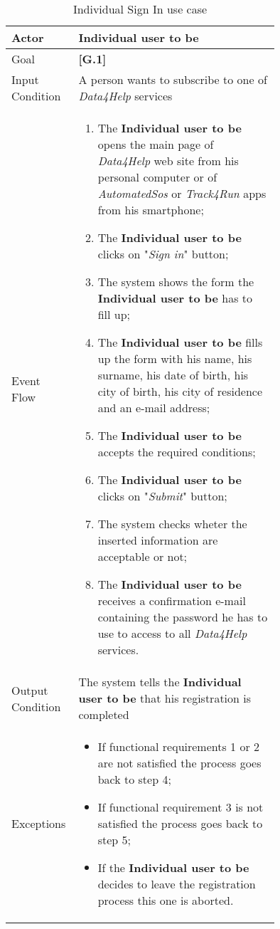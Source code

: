 \begin{center}
\begin{table}
\begin{tabular}{ | l | p{0.75\linewidth} | }
  \hline
    Actor & \textbf{Individual user to be} \\ \hline
    Goal & \textbf{[G.1]} \\ \hline
    Input Condition & A person wants to subscribe to one of \textit{Data4Help} services \\ \hline
    Event Flow & \begin{minipage}[t]{0.7\textwidth}
      \begin{enumerate}
        \item The \textbf{Individual user to be} opens the main page of \textit{Data4Help} web site from his personal computer or of \textit{AutomatedSos} or \textit{Track4Run} apps from his smartphone;
        \item The \textbf{Individual user to be} clicks on "\textit{Sign in}" button;
        \item The system shows the form the \textbf{Individual user to be} has to fill up;
        \item The \textbf{Individual user to be} fills up the form with his name, his surname, his date of birth, his city of birth, his city of residence and an e-mail address;
        \item The \textbf{Individual user to be} accepts the required conditions;
        \item The \textbf{Individual user to be} clicks on "\textit{Submit}" button;
        \item The system checks wheter the inserted information are acceptable or not;
        \item The \textbf{Individual user to be} receives a confirmation e-mail containing the password he has to use to access to all \textit{Data4Help} services.
      \end{enumerate}
    \smallskip
  \end{minipage} \\ \hline
  Output Condition & The system tells the \textbf{Individual user to be} that his registration is completed \\ \hline
  Exceptions & \begin{minipage}[t]{0.7\textwidth}
    \begin{itemize}
      \smallskip
      \item If functional requirements 1 or 2 are not satisfied the process goes back to step 4;
      \item If functional requirement 3 is not satisfied the process goes back to step 5;
      \item If the \textbf{Individual user to be} decides to leave the registration process this one is aborted.
    \end{itemize}
    \smallskip
  \end{minipage}  \\ \hline
\end{tabular}
\caption{Individual Sign In use case}
\label{table:individualSignInTable}
\end{table}
\end{center}
